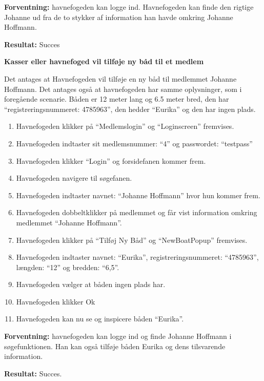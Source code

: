 \textbf{Forventning:} havnefogeden kan logge ind. Havnefogeden kan finde den rigtige Johanne ud fra de to stykker af information han havde omkring Johanne Hoffmann.

\textbf{Resultat:} Succes


\textbf{Kasser eller havnefoged vil tilføje ny båd til et medlem}

Det antages at Havnefogeden vil tilføje en ny båd til medlemmet Johanne Hoffmann. Det antages også at havnefogeden har samme oplysninger, som i foregående scenarie. Båden er 12 meter lang og 6.5 meter bred, den har \enquote{registreringsnummeret: 4785963}, den hedder \enquote{Eurika} og den har ingen plads.
\begin{enumerate}
	\item Havnefogeden klikker på \enquote{Medlemslogin} og \enquote{Loginscreen} fremvises.
	\item Havnefogeden indtaster sit medlemsnummer: \enquote{4} og passwordet: \enquote{testpass}
	\item Havnefogeden klikker \enquote{Login} og forsidefanen kommer frem.
	\item Havnefogeden navigere til søgefanen.
	\item Havnefogeden indtaster navnet: \enquote{Johanne Hoffmann} hvor hun kommer frem.
	\item Havnefogeden dobbeltklikker på medlemmet og får vist information omkring medlemmet \enquote{Johanne Hoffmann}.
	\item Havnefogeden klikker på \enquote{Tilføj Ny Båd} og \enquote{NewBoatPopup} fremvises.
	\item Havnefogeden indtaster navnet: \enquote{Eurika}, registreringsnummeret: \enquote{4785963}, længden: \enquote{12} og bredden: \enquote{6,5}.
	\item Havnefogeden vælger at båden ingen plads har.
	\item Havnefogeden klikker Ok
	\item Havnefogeden kan nu se og inspicere båden \enquote{Eurika}.
\end{enumerate}

\textbf{Forventning:} havnefogeden kan logge ind og finde Johanne Hoffmann i søgefunktionen. Han kan også tilføje båden Eurika og dens tilsvarende information.

\textbf{Resultat:} Succes.



